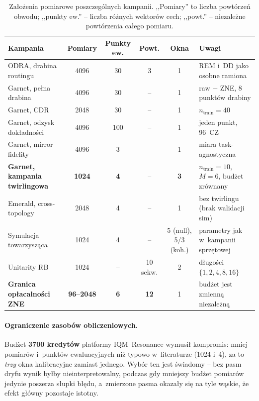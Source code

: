 \documentclass[11pt]{article}
\begin{document}
\begin{table}[!ht]\centering
\caption{Założenia pomiarowe poszczególnych kampanii. ,,Pomiary'' to liczba powtórzeń obwodu;
,,punkty ew.'' -- liczba różnych wektorów cech; ,,powt.'' -- niezależne powtórzenia całego pomiaru.}
\label{tab:zalozenia}
\small
\begin{tabular}{p{3.9cm}ccccp{3.3cm}}
\toprule
Kampania & Pomiary & Punkty ew. & Powt. & Okna & Uwagi \\
\midrule
ODRA, drabina routingu & 4096 & 30 & 3 & 1 & REM i~DD jako osobne ramiona \\
Garnet, pełna drabina & 4096 & 30 & -- & 1 & raw + ZNE, 8 punktów drabiny \\
Garnet, CDR & 2048 & 30 & -- & 1 & $n_{\text{train}}=40$ \\
Garnet, odzysk dokładności & 4096 & 100 & -- & 1 & jeden punkt, 96~CZ \\
Garnet, mirror fidelity & 4096 & 3 & -- & 1 & miara task-agnostyczna \\
\textbf{Garnet, kampania twirlingowa} & \textbf{1024} & \textbf{4} & -- & \textbf{3} &
  $n_{\text{train}}=10$, $M=6$, budżet zrównany \\
Emerald, cross-topology & 2048 & 4 & -- & 1 & bez twirlingu (brak walidacji sim) \\
Symulacja towarzysząca & 1024 & 4 & -- & 5 (null), 5/3 (koh.) & parametry jak w~kampanii sprzętowej \\
Unitarity RB & 1024 & -- & 10 sekw. & 2 & długości $\{1,2,4,8,16\}$ \\
\textbf{Granica opłacalności ZNE} & \textbf{96--2048} & \textbf{6} & \textbf{12} & 1 &
  budżet jest zmienną niezależną \\
\bottomrule
\end{tabular}
\end{table}

\paragraph{Ograniczenie zasobów obliczeniowych.} Budżet \textbf{3700 kredytów} platformy
IQM~Resonance wymusił kompromis: mniej pomiarów i~punktów ewaluacyjnych niż typowo w~literaturze
(1024 i~4), za to \emph{trzy} okna kalibracyjne zamiast jednego. Wybór ten jest świadomy -- bez
pasm dryfu wynik byłby nieinterpretowalny, podczas gdy mniejszy budżet pomiarów jedynie poszerza
słupki błędu, a~zmierzone pasma okazały się na tyle wąskie, że efekt główny pozostaje istotny.
\end{document}
